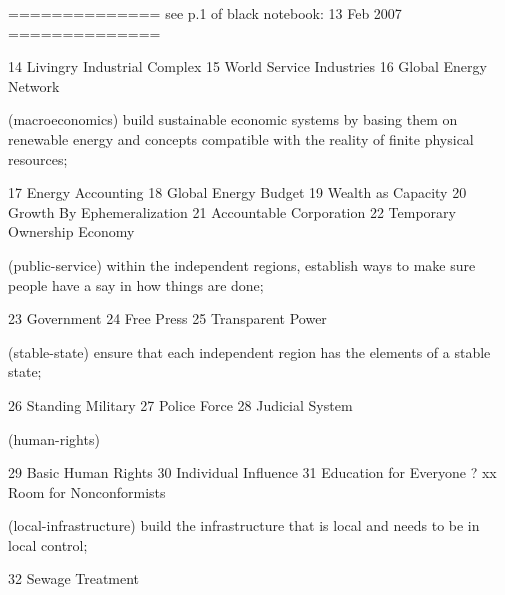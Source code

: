 ==============
see p.1 of black notebook: 13 Feb 2007
==============

	14  Livingry Industrial Complex
	15  World Service Industries
	16  Global Energy Network

(macroeconomics) build sustainable economic systems by basing them on renewable energy and concepts compatible with the reality of finite physical resources;

	17  Energy Accounting
	18  Global Energy Budget
	19  Wealth as Capacity
	20  Growth By Ephemeralization
	21  Accountable Corporation
	22  Temporary Ownership Economy

(public-service) within the independent regions, establish ways to make sure people have a say in how things are done;

	23  Government
	24  Free Press
	25  Transparent Power

(stable-state) ensure that each independent region has the elements of a stable state;

	26  Standing Military   %
	27  Police Force
	28  Judicial System

(human-rights)

	29  Basic Human Rights
	30  Individual Influence
	31  Education for Everyone
?	xx  Room for Nonconformists   %

(local-infrastructure) build the infrastructure that is local and needs to be in local control;

	32  Sewage Treatment

